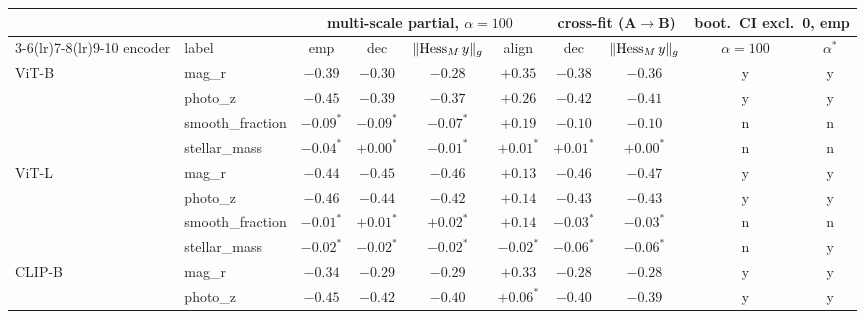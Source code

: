 \begin{tabular}{llcccccccc}
\toprule
 & & \multicolumn{4}{c}{multi-scale partial, $\alpha=100$} & \multicolumn{2}{c}{cross-fit (A$\to$B)} & \multicolumn{2}{c}{boot.\ CI excl.\ 0, emp} \\
\cmidrule(lr){3-6}\cmidrule(lr){7-8}\cmidrule(lr){9-10}
encoder & label & emp & dec & $\lVert \operatorname{Hess}_M y \rVert_g$ & align & dec & $\lVert \operatorname{Hess}_M y \rVert_g$ & $\alpha=100$ & $\alpha^*$ \\
\midrule
ViT-B & mag\_r & $-0.39$ & $-0.30$ & $-0.28$ & $+0.35$ & $-0.38$ & $-0.36$ & y & y \\
 & photo\_z & $-0.45$ & $-0.39$ & $-0.37$ & $+0.26$ & $-0.42$ & $-0.41$ & y & y \\
 & smooth\_fraction & $-0.09^{*}$ & $-0.09^{*}$ & $-0.07^{*}$ & $+0.19$ & $-0.10$ & $-0.10$ & n & n \\
 & stellar\_mass & $-0.04^{*}$ & $+0.00^{*}$ & $-0.01^{*}$ & $+0.01^{*}$ & $+0.01^{*}$ & $+0.00^{*}$ & n & n \\
\addlinespace[2pt]
ViT-L & mag\_r & $-0.44$ & $-0.45$ & $-0.46$ & $+0.13$ & $-0.46$ & $-0.47$ & y & y \\
 & photo\_z & $-0.46$ & $-0.44$ & $-0.42$ & $+0.14$ & $-0.43$ & $-0.43$ & y & y \\
 & smooth\_fraction & $-0.01^{*}$ & $+0.01^{*}$ & $+0.02^{*}$ & $+0.14$ & $-0.03^{*}$ & $-0.03^{*}$ & n & n \\
 & stellar\_mass & $-0.02^{*}$ & $-0.02^{*}$ & $-0.02^{*}$ & $-0.02^{*}$ & $-0.06^{*}$ & $-0.06^{*}$ & n & y \\
\addlinespace[2pt]
CLIP-B & mag\_r & $-0.34$ & $-0.29$ & $-0.29$ & $+0.33$ & $-0.28$ & $-0.28$ & y & y \\
 & photo\_z & $-0.45$ & $-0.42$ & $-0.40$ & $+0.06^{*}$ & $-0.40$ & $-0.39$ & y & y \\

\end{tabular}
